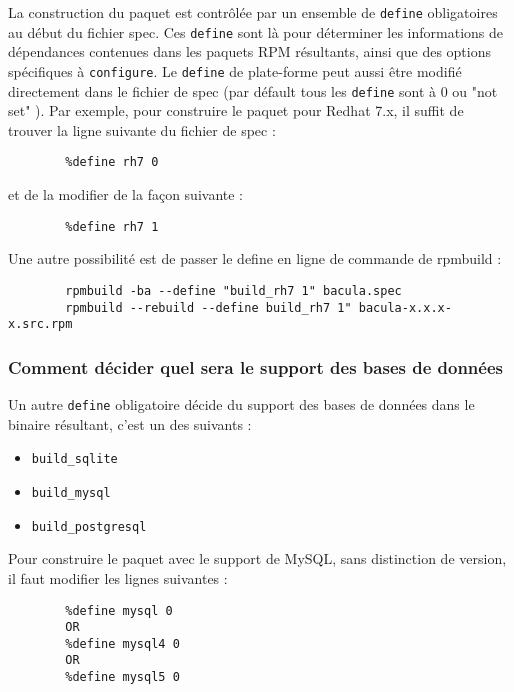    La construction du paquet est contrôlée par un ensemble de \texttt{define}
   obligatoires au début du fichier spec. Ces \texttt{define} sont là pour 
   déterminer les informations de dépendances contenues dans les paquets RPM
   résultants, ainsi que des options spécifiques à \texttt{configure}. 
   Le \texttt{define} de plate-forme peut aussi être modifié directement dans
   le fichier de spec (par défault tous les \texttt{define} sont à 0 ou "not set"
   ). Par exemple, pour construire le paquet pour Redhat 7.x, il suffit de 
   trouver la ligne suivante du fichier de spec :

\footnotesize
\begin{verbatim}
        %define rh7 0
\end{verbatim}
\normalsize

et de la modifier de la façon suivante :

\footnotesize
\begin{verbatim}
        %define rh7 1
\end{verbatim}
\normalsize

Une autre possibilité est de passer le define en ligne de commande de rpmbuild :

\footnotesize
\begin{verbatim}
        rpmbuild -ba --define "build_rh7 1" bacula.spec
        rpmbuild --rebuild --define build_rh7 1" bacula-x.x.x-x.src.rpm
\end{verbatim}
\normalsize

   
   \subsubsection{Comment décider quel sera le support des bases de données}
   Un autre \texttt{define} obligatoire décide du support des bases de données
   dans le binaire résultant, c'est un des suivants : 
   \begin{itemize}
   \item \texttt{build\_sqlite}
   \item \texttt{build\_mysql}
   \item \texttt{build\_postgresql}
   \end{itemize}
   Pour construire le paquet avec le support de MySQL, sans distinction de 
   version, il faut modifier les lignes suivantes :

\footnotesize
\begin{verbatim}
        %define mysql 0
        OR
        %define mysql4 0
        OR
        %define mysql5 0
\end{verbatim}
\normalsize

